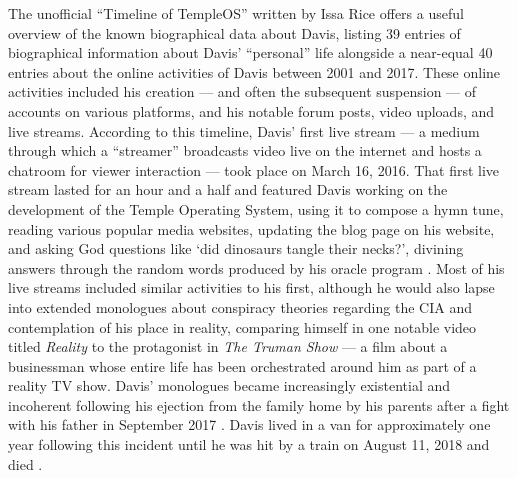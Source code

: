 \documentclass[Draft.tex]{subfiles}
\begin{document}
The unofficial ``Timeline of TempleOS'' written by Issa Rice
\parencite*{Rice18} offers a useful overview of the known
biographical data about Davis, listing 39 entries of biographical information
about Davis' ``personal'' life alongside a near-equal 40 entries about
the online activities of Davis between 2001 and 2017.
These online activities included his creation --- and
often the subsequent suspension --- of accounts on various platforms,
and his notable forum posts, video uploads, and live streams.
According to this timeline, Davis' first live stream ---
a medium through which a ``streamer'' broadcasts video live on the internet
and hosts a chatroom for viewer interaction --- took place on March 16, 2016.
That first live stream lasted for an hour and a half and featured Davis
working on the development of the Temple Operating System,
using it to compose a hymn tune, reading various popular media websites,
updating the blog page on his website, and asking God questions
like `did dinosaurs tangle their necks?', divining answers through the
random words produced by his oracle program
\parencite[59:05]{FirstLiveStream}.
Most of his live streams included similar activities to his first,
although he would also lapse into extended monologues about
conspiracy theories regarding the CIA and contemplation of his place in
reality,
comparing himself in one notable video titled \textit{Reality}
\parencite{Reality} to the protagonist in \textit{The Truman Show}
--- a film about a businessman whose entire life has been
orchestrated around him as part of a reality TV show.
Davis' monologues became increasingly existential and incoherent following
his ejection from the family home by his parents after a fight
with his father in September 2017 \parencite{Homeless}.
Davis lived in a van for approximately one year following this incident
until he was hit by a train on August 11, 2018 and died \parencite{Cecil18}.
\end{document}
